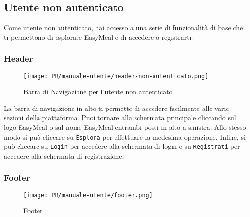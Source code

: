 \subsection{Utente non autenticato}
Come utente non autenticato, hai accesso a una serie di funzionalità di base che 
ti permettono di esplorare EasyMeal e di accedere o registrarti.

\subsubsection{Header}

\begin{figure}[htbp]
    \centering
	\texttt{[image: PB/manuale-utente/header-non-autenticato.png]}
    \caption{Barra di Navigazione per l'utente non autenticato}
\end{figure}

La barra di navigazione in alto ti permette di accedere facilmente alle varie 
sezioni della piattaforma. 
Puoi tornare alla schermata principale cliccando sul logo EasyMeal o sul nome 
EasyMeal entrambi posti in alto a sinistra. Allo stesso modo si può cliccare su
\texttt{Esplora} per effettuare la medesima operazione. Infine, si può cliccare
su \texttt{Login} per accedere alla schermata di login e su 
\texttt{Registrati} per accedere alla schermata di registrazione.

\subsubsection{Footer}

\begin{figure}[htbp]
    \centering
	\texttt{[image: PB/manuale-utente/footer.png]}
    \caption{Footer}
\end{figure}

